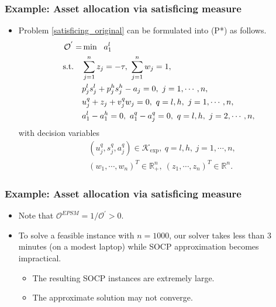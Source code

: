 \documentclass{beamer}
\begin{document}
\begin{frame}
	\frametitle{Example: Asset allocation via satisficing measure}
	\begin{itemize}
		\item Problem \eqref{satisficing_original} can be formulated into (P*) as follows.
		\begin{align}\label{epsm_std_form_minimization}
		\begin{split}
		\mathcal{O}^{'} = &\min\ \ a_1^l \\
		\textnormal{s.t.}\quad &\sum_{j=1}^n z_j = -\tau,\ \sum_{j=1}^n w_j = 1, \\
		& p_j^l s_j^l +p_j^h s_j^h - a_j = 0,\ j=1,\cdots,n, \\
		& u_j^q + z_j + v_j^q w_j = 0,\ q=l,h,\ j = 1,\cdots, n, \\
		& a^l_1 - a^h_1 =0,\ a^q_1 - a^q_j = 0,\ q=l,h,\ j = 2, \cdots, n, \\
		\end{split}
		\end{align}
		with decision variables
		\begin{align*}
		&\left(u_j^q, s_j^q, a_j^q\right) \in \mathcal{K}_{\exp},\ q = l,h,\ j=1,\cdots,n, \\
		&\left(w_1,\cdots,w_n\right)^T\in \mathbb{R}_+^n,\ \left(z_1,\cdots,z_n\right)^T \in \mathbb{R}^n.
		\end{align*}
	\end{itemize}
\end{frame}

\begin{frame}
	\frametitle{Example: Asset allocation via satisficing measure}
	\begin{itemize}
		\item Note that $\mathcal{O}^{EPSM} = 1/\mathcal{O}^{'}>0$.
		\item To solve a feasible instance with $n= 1000$, our solver takes less than 3 minutes (on a modest laptop) while SOCP approximation becomes impractical.
		\begin{itemize}
			\item The resulting SOCP instances are extremely large.
			\item The approximate solution may not converge.
		\end{itemize}
	\end{itemize}
\end{frame}
\end{document}
